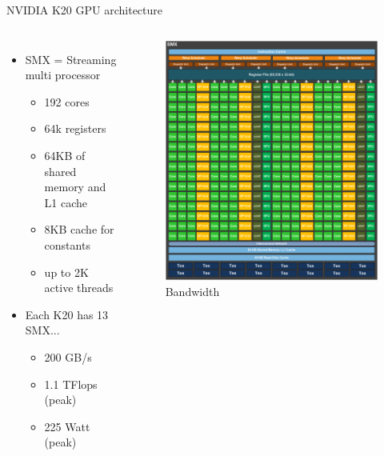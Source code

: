 \documentclass[10pt,times]{beamer}
\begin{document}
\begin{frame}{NVIDIA K20 GPU architecture}
\begin{columns}
\begin{itemize}
\item SMX = Streaming multi processor
\begin{itemize}
\item 192 cores
\item 64k registers
\item 64KB of shared memory and L1 cache
\item 8KB cache for constants
\item up to 2K active threads
\end{itemize}
\item Each K20 has 13 SMX...
\begin{itemize}
\item 200 GB/s
\item 1.1 TFlops (peak)
\item 225 Watt (peak)
\end{itemize}
\end{itemize}
\begin{figure}
\includegraphics[width=\linewidth]{figs/GPU_layout.png}
\caption*{Bandwidth}
\end{figure}
\end{columns}
\end{frame}
\end{document}
